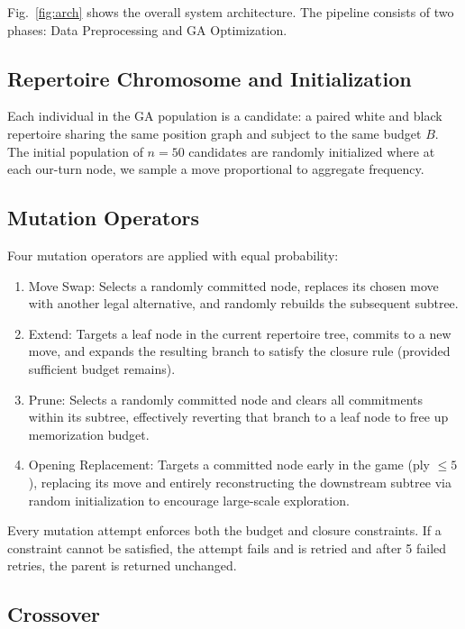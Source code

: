 \documentclass[conference]{IEEEtran}
\begin{document}
Fig.~\ref{fig:arch} shows the overall system architecture. The pipeline
consists of two phases: Data Preprocessing and GA Optimization.

\subsection{Repertoire Chromosome and Initialization}

Each individual in the GA population is a candidate: a paired white and black repertoire sharing the same position graph and subject to the same budget $B$. The initial population of $n = 50$ candidates are randomly initialized where at each our-turn node, we sample a move proportional to aggregate frequency.

\subsection{Mutation Operators}

Four mutation operators are applied with equal probability:
\begin{enumerate}
    \item Move Swap: Selects a randomly committed node, replaces its chosen move with another legal alternative, and randomly rebuilds the subsequent subtree.
    \item Extend: Targets a leaf node in the current repertoire tree, commits to a new move, and expands the resulting branch to satisfy the closure rule (provided sufficient budget remains).
    \item Prune: Selects a randomly committed node and clears all commitments within its subtree, effectively reverting that branch to a leaf node to free up memorization budget.
    \item Opening Replacement: Targets a committed node early in the game (ply $\leq 5$), replacing its move and entirely reconstructing the downstream subtree via random initialization to encourage large-scale exploration.
\end{enumerate}

Every mutation attempt enforces both the budget and closure constraints.
If a constraint cannot be satisfied, the attempt fails and is retried and after 5 failed retries, the parent is returned unchanged.

\subsection{Crossover}
\end{document}
